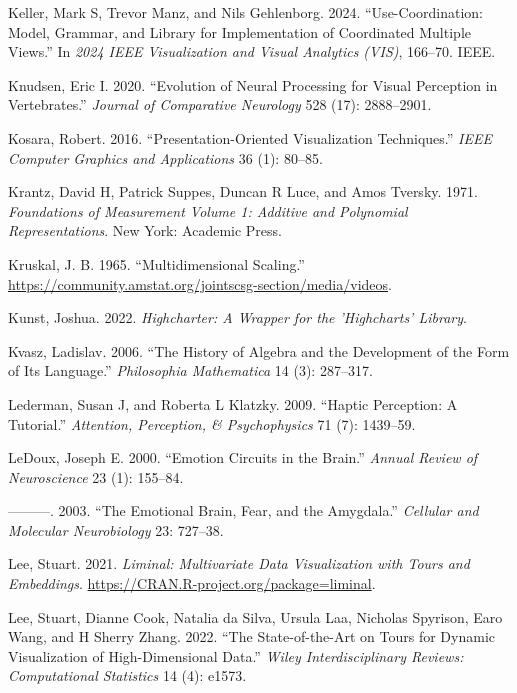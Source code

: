 \documentclass[
]{book}
\newlength{\cslhangindent}
\newenvironment{CSLReferences}[2] %
 {\begin{list}{}{%
  \setlength{\itemindent}{0pt}
  \setlength{\leftmargin}{0pt}
  \setlength{\parsep}{0pt}
  \ifodd #1
   \setlength{\leftmargin}{\cslhangindent}
   \setlength{\itemindent}{-1\cslhangindent}
  \fi
  \setlength{\itemsep}{#2\baselineskip}}}
 {\end{list}}
\begin{document}
\begin{CSLReferences}{1}{0}
Keller, Mark S, Trevor Manz, and Nils Gehlenborg. 2024. {``Use-Coordination: Model, Grammar, and Library for Implementation of Coordinated Multiple Views.''} In \emph{2024 IEEE Visualization and Visual Analytics (VIS)}, 166--70. IEEE.

Knudsen, Eric I. 2020. {``Evolution of Neural Processing for Visual Perception in Vertebrates.''} \emph{Journal of Comparative Neurology} 528 (17): 2888--2901.

Kosara, Robert. 2016. {``Presentation-Oriented Visualization Techniques.''} \emph{IEEE Computer Graphics and Applications} 36 (1): 80--85.

Krantz, David H, Patrick Suppes, Duncan R Luce, and Amos Tversky. 1971. \emph{Foundations of Measurement Volume 1: Additive and Polynomial Representations}. New York: Academic Press.

Kruskal, J. B. 1965. {``{Multidimensional Scaling}.''} \url{https://community.amstat.org/jointscsg-section/media/videos}.

Kunst, Joshua. 2022. \emph{Highcharter: A Wrapper for the 'Highcharts' Library}.

Kvasz, Ladislav. 2006. {``The History of Algebra and the Development of the Form of Its Language.''} \emph{Philosophia Mathematica} 14 (3): 287--317.

Lederman, Susan J, and Roberta L Klatzky. 2009. {``Haptic Perception: A Tutorial.''} \emph{Attention, Perception, \& Psychophysics} 71 (7): 1439--59.

LeDoux, Joseph E. 2000. {``Emotion Circuits in the Brain.''} \emph{Annual Review of Neuroscience} 23 (1): 155--84.

---------. 2003. {``The Emotional Brain, Fear, and the Amygdala.''} \emph{Cellular and Molecular Neurobiology} 23: 727--38.

Lee, Stuart. 2021. \emph{Liminal: Multivariate Data Visualization with Tours and Embeddings}. \url{https://CRAN.R-project.org/package=liminal}.

Lee, Stuart, Dianne Cook, Natalia da Silva, Ursula Laa, Nicholas Spyrison, Earo Wang, and H Sherry Zhang. 2022. {``The State-of-the-Art on Tours for Dynamic Visualization of High-Dimensional Data.''} \emph{Wiley Interdisciplinary Reviews: Computational Statistics} 14 (4): e1573.


\end{CSLReferences}
\end{document}
